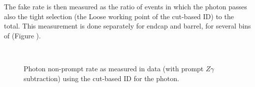 
The fake rate is then measured as the ratio of events in which the photon passes also the tight selection (the Loose working point of the cut-based ID)
to the total.
This measurement is done separately for endcap and barrel, for several bins of \pt (Figure ).

\begin{figure}
%
\\
%
\caption{Photon non-prompt rate as measured in data (with prompt $Z\gamma$ subtraction) using the cut-based ID for the photon.}
\label{fig:phFR_VLtoL}
\end{figure}

